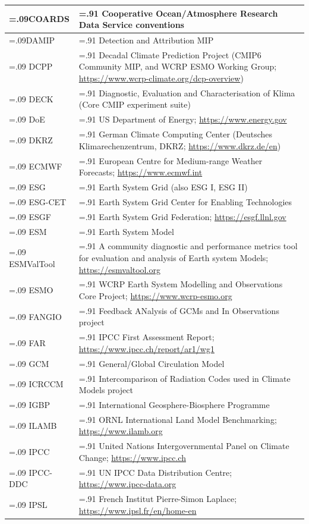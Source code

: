 \documentclass[gmd, preprint]{copernicus}
\begin{document}
\begin{table}[htp]
{\begin{tabularx}{1\textwidth} { 
	  | >{\raggedright\arraybackslash\hsize=.09\hsize}X
	  | >{\centering\arraybackslash\hsize=.91\hsize}X | }
COARDS & Cooperative Ocean/Atmosphere Research Data Service conventions \\
\hline
DAMIP & Detection and Attribution MIP \\
\hline
DCPP & Decadal Climate Prediction Project (CMIP6 Community MIP, and WCRP ESMO Working Group; \url{https://www.wcrp-climate.org/dcp-overview}) \\
\hline
DECK & Diagnostic, Evaluation and Characterisation of Klima (Core CMIP experiment suite) \\
\hline
DoE & US Department of Energy; \url{https://www.energy.gov} \\
\hline
DKRZ & German Climate Computing Center (Deutsches Klimarechenzentrum, DKRZ; \url{https://www.dkrz.de/en}) \\
\hline
ECMWF & European Centre for Medium-range Weather Forecasts; \url{https://www.ecmwf.int} \\
\hline
ESG & Earth System Grid (also ESG I, ESG II) \\
\hline
ESG-CET & Earth System Grid Center for Enabling Technologies \\
\hline
ESGF & Earth System Grid Federation; \url{https://esgf.llnl.gov} \\
\hline
ESM & Earth System Model \\
\hline
ESMValTool & A community diagnostic and performance metrics tool for evaluation and analysis of Earth system Models; \url{https://esmvaltool.org} \\
\hline
ESMO & WCRP Earth System Modelling and Observations Core Project; \url{https://www.wcrp-esmo.org} \\
\hline
FANGIO & Feedback ANalysis of GCMs and In Observations project \\
\hline
FAR & IPCC First Assessment Report; \url{https://www.ipcc.ch/report/ar1/wg1} \\
\hline
GCM & General/Global Circulation Model \\
\hline
ICRCCM & Intercomparison of Radiation Codes used in Climate Models project \\
\hline
IGBP & International Geosphere-Biosphere Programme \\
\hline
ILAMB & ORNL International Land Model Benchmarking; \url{https://www.ilamb.org} \\
\hline
IPCC & United Nations Intergovernmental Panel on Climate Change; \url{https://www.ipcc.ch} \\
\hline
IPCC-DDC & UN IPCC Data Distribution Centre; \url{https://www.ipcc-data.org} \\
\hline
IPSL & French Institut Pierre-Simon Laplace; \url{https://www.ipsl.fr/en/home-en} \\
\hline
\end{tabularx}
} %
\label{tab:tabAppE1-Acronyms}
\end{table}
\end{document}
